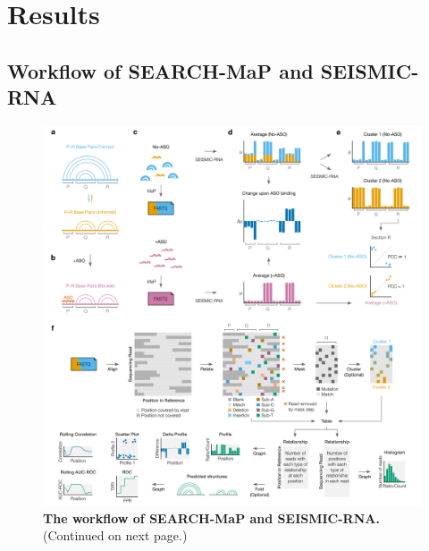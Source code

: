 \documentclass[main.tex]{subfiles}
\begin{document}
\section{Results}

\subsection{Workflow of SEARCH-MaP and SEISMIC-RNA}


\begin{figure}[H]
	\includegraphics[width=\textwidth]{../MainFigures/wf/wf.png}
	\caption{\textbf{The workflow of SEARCH-MaP and SEISMIC-RNA.} (Continued on next page.)}
	\label{strat}
\end{figure}
\addtocounter{figure}{-1}
\end{document}
